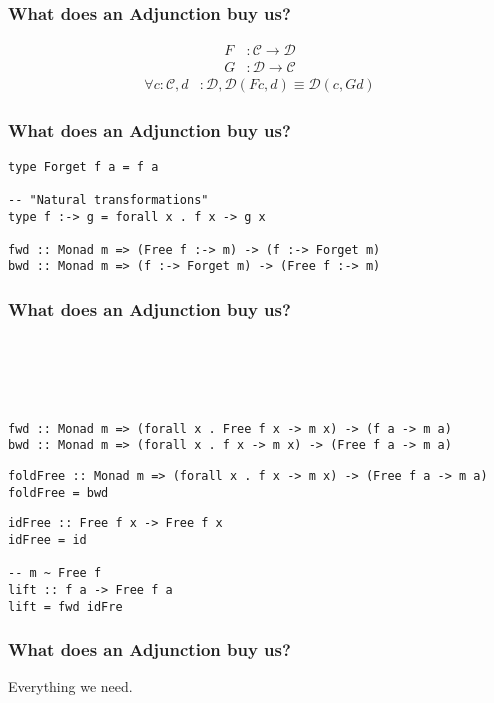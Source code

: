\documentclass[pdf]{beamer}
\renewcommand{\to}{\ensuremath{\rightarrow}}
\begin{document}
\begin{frame}[fragile]
  \frametitle{What does an Adjunction buy us?}
  \begin{align*}
    F &: \mathcal{C} \to \mathcal{D} \\
    G &: \mathcal{D} \to \mathcal{C}
  \end{align*}
  \pause
  \begin{align*}
    \forall c : \mathcal{C}, d &: \mathcal{D}, \mathcal{D}(F c, d) \equiv \mathcal{D}(c, G d)
  \end{align*}
\end{frame}

\begin{frame}[fragile]
  \frametitle{What does an Adjunction buy us?}
\begin{lstlisting}
type Forget f a = f a

-- "Natural transformations"
type f :-> g = forall x . f x -> g x

fwd :: Monad m => (Free f :-> m) -> (f :-> Forget m)
bwd :: Monad m => (f :-> Forget m) -> (Free f :-> m)
\end{lstlisting}
\end{frame}

\begin{frame}[fragile]
  \frametitle{What does an Adjunction buy us?}
\begin{lstlisting}





fwd :: Monad m => (forall x . Free f x -> m x) -> (f a -> m a)
bwd :: Monad m => (forall x . f x -> m x) -> (Free f a -> m a)
\end{lstlisting}
\end{frame}

\begin{frame}[fragile]
\begin{lstlisting}
foldFree :: Monad m => (forall x . f x -> m x) -> (Free f a -> m a)
foldFree = bwd
\end{lstlisting}
\end{frame}

\begin{frame}[fragile]
\begin{lstlisting}
idFree :: Free f x -> Free f x
idFree = id

-- m ~ Free f
lift :: f a -> Free f a
lift = fwd idFre
\end{lstlisting}
\end{frame}

\begin{frame}
  \frametitle{What does an Adjunction buy us?}
  Everything we need.
\end{frame}
\end{document}
